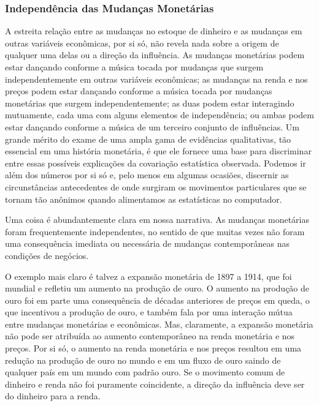 \documentclass[a4paper,12pt]{article}[abntex2]
\begin{document}
 \subsubsection{\textbf{Independência das Mudanças Monetárias}}

A estreita relação entre as mudanças no estoque de dinheiro e as mudanças em outras variáveis econômicas, por si só, não revela nada sobre a origem de qualquer uma delas ou a direção da influência. As mudanças monetárias podem estar dançando conforme a música tocada por mudanças que surgem independentemente em outras variáveis econômicas; as mudanças na renda e nos preços podem estar dançando conforme a música tocada por mudanças monetárias que surgem independentemente; as duas podem estar interagindo mutuamente, cada uma com alguns elementos de independência; ou ambas podem estar dançando conforme a música de um terceiro conjunto de influências. Um grande mérito do exame de uma ampla gama de evidências qualitativas, tão essencial em uma história monetária, é que ele fornece uma base para discriminar entre essas possíveis explicações da covariação estatística observada. Podemos ir além dos números por si só e, pelo menos em algumas ocasiões, discernir as circunstâncias antecedentes de onde surgiram os movimentos particulares que se tornam tão anônimos quando alimentamos as estatísticas no computador.

Uma coisa é abundantemente clara em nossa narrativa. As mudanças monetárias foram frequentemente independentes, no sentido de que muitas vezes não foram uma consequência imediata ou necessária de mudanças contemporâneas nas condições de negócios.

O exemplo mais claro é talvez a expansão monetária de 1897 a 1914, que foi mundial e refletiu um aumento na produção de ouro. O aumento na produção de ouro foi em parte uma consequência de décadas anteriores de preços em queda, o que incentivou a produção de ouro, e também fala por uma interação mútua entre mudanças monetárias e econômicas. Mas, claramente, a expansão monetária não pode ser atribuída ao aumento contemporâneo na renda monetária e nos preços. Por si só, o aumento na renda monetária e nos preços resultou em uma redução na produção de ouro no mundo e em um fluxo de ouro saindo de qualquer país em um mundo com padrão ouro. Se o movimento comum de dinheiro e renda não foi puramente coincidente, a direção da influência deve ser do dinheiro para a renda.
\end{document}

